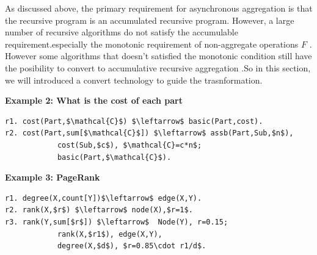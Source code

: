 {

As discussed above, the primary requirement for asynchronous aggregation is that the recursive program is an accumulated recursive program. %
However, a large number of recursive algorithms do not satisfy the accumulable requirement.especially the monotonic requirement of non-aggregate operations $F$ . However some algorithms that doesn't satisfied the monotonic condition still have the posibility to convert to accumulative recursive aggregation .So in this section, we will introduced a convert technology to guide the trasnformation.
}

\textbf{Example 2: What is the cost of each part}
\small
\begin{lstlisting}
r1. cost(Part,$\mathcal{C}$) $\leftarrow$ basic(Part,cost).
r2. cost(Part,sum[$\mathcal{C}$]) $\leftarrow$ assb(Part,Sub,$n$),
			cost(Sub,$c$), $\mathcal{C}=c*n$;
			basic(Part,$\mathcal{C}$).
\end{lstlisting}
\normalsize



\textbf{Example 3: PageRank}
\small
\begin{lstlisting}
r1. degree(X,count[Y])$\leftarrow$ edge(X,Y).
r2. rank(X,$r$) $\leftarrow$ node(X),$r=1$.
r3. rank(Y,sum[$r$]) $\leftarrow$  Node(Y), r=0.15;
			rank(X,$r1$), edge(X,Y),
			degree(X,$d$), $r=0.85\cdot r1/d$.
\end{lstlisting}
\normalsize


